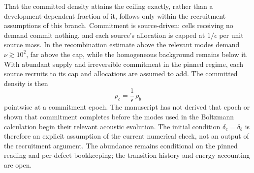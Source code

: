 \documentclass[11pt]{article}
\begin{document}
That the committed density attains the ceiling exactly, rather than a development-dependent fraction of it, follows only within the recruitment assumptions of this branch. Commitment is source-driven: cells receiving no demand commit nothing, and each source's allocation is capped at $1/\epsilon$ per unit source mass. In the recombination estimate above the relevant modes demand $\nu\gtrsim10^2$, far above the cap, while the homogeneous background remains below it. With abundant supply and irreversible commitment in the pinned regime, each source recruits to its cap and allocations are assumed to add. The committed density is then
\[
\rho_c=\frac{1}{\epsilon}\,\rho_b
\]
pointwise at a commitment epoch. The manuscript has not derived that epoch or shown that commitment completes before the modes used in the Boltzmann calculation begin their relevant acoustic evolution. The initial condition $\delta_c=\delta_b$ is therefore an explicit assumption of the current numerical check, not an output of the recruitment argument. The abundance remains conditional on the pinned reading and per-defect bookkeeping; the transition history and energy accounting are open.
\end{document}
